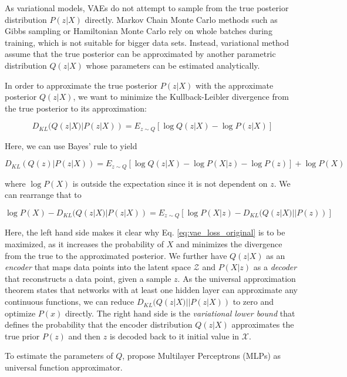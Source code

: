 \documentclass[6pt]{article}
\begin{document}
{As variational models, VAEs do not attempt to sample from the true posterior distribution $P(z|X)$ directly. Markov Chain Monte Carlo methods such as Gibbs sampling or Hamiltonian Monte Carlo rely on whole batches during training, which is not suitable for bigger data sets. Instead, variational method assume that the true posterior can be approximated by another parametric distribution $Q(z|X)$ whose parameters can be estimated analytically. 

In order to approximate the true posterior  $P(z|X)$ with the approximate posterior $Q(z|X)$, we want to minimize the Kullback-Leibler divergence from the true posterior to its approximation: 

\begin{equation}
D_{KL}(Q(z|X)|P(z|X)) = E_{z\sim Q}[\log Q(z|X) - \log P(z|X)]
\end{equation}

Here, we can use Bayes' rule to yield 

\begin{equation}
D_{KL}(Q(z)|P(z|X)) = E_{z\sim Q}[\log Q(z|X) - \log P(X|z)-\log P(z)] + \log P(X)
\end{equation}

where $\log P(X)$ is outside the expectation since it is not dependent on $z$. We can rearrange that to 

\begin{equation}
\label{eq:vae_loss_original}
\log P(X) - D_{KL}(Q(z|X)|P(z|X)) = E_{z\sim Q}[\log P(X|z) - D_{KL}(Q(z|X)||P(z))] 
\end{equation}

Here, the left hand side makes it clear why Eq. \ref{eq:vae_loss_original} is to be maximized, as it increases the probability of $X$ and minimizes the divergence from the true to the approximated posterior. We further have $Q(z|X)$ as an \textit{encoder} that maps data points into the latent space $\mathcal{Z}$ and $P(X|z)$ as a \textit{decoder} that reconstructs a data point, given a sample $z$. As the universal approximation theorem states that networks with at least one hidden layer can approximate any continuous functions, we can reduce $D_{KL}(Q(z|X)||P(z|X))$ to zero and optimize $P(x)$ directly. The right hand side is the \textit{variational lower bound} that defines the probability that the encoder distribution $Q(z|X)$ approximates the true prior $P(z)$ and then $z$ is decoded back to it initial value in $\mathcal{X}$.

To estimate the parameters of $Q$,  \cite{kingma2013auto} propose Multilayer Perceptrons (MLPs) as universal function approximator.

}
\end{document}

